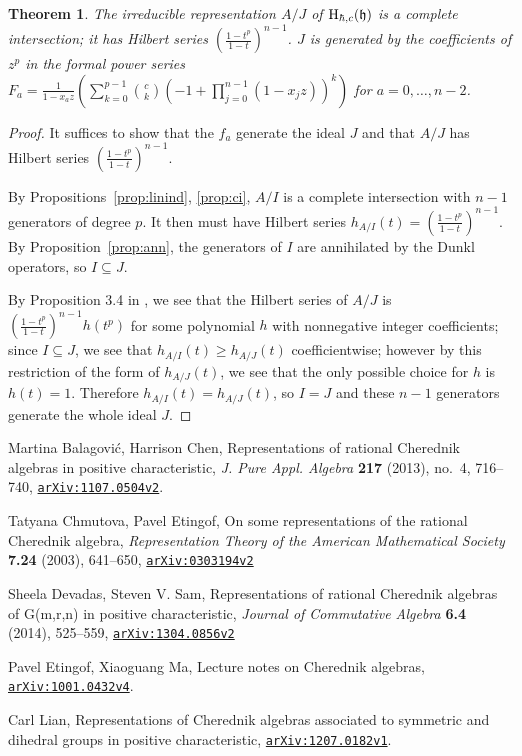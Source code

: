 \documentclass{article}
\numberwithin{equation}{section}
\newtheorem{theorem}[equation]{Theorem}
\newcommand{\h}{\mathfrak{h}}
\newcommand{\HH}{{\rm H}}
\newcommand{\arxiv}[1]{\href{http://arxiv.org/abs/#1}{{\tt arXiv:#1}}}
\begin{document}
\begin{theorem}\label{thm:main} The irreducible representation $A/J$  of $\HH_{\hbar,c}(\h)$ is a complete intersection; it has Hilbert series $\left(\frac{1-t^p}{1-t}\right)^{n-1}$. $J$ is generated by the coefficients of $z^p$ in the formal power series
\\$F_a=\frac{1}{1-x_az} \left( \sum_{k=0}^{p-1} \binom{c}{k}(-1+\prod_{j=0}^{n-1} (1-x_jz))^k\right)$ for $a=0,\dots,n-2$. 
\end{theorem} 

\begin{proof} It suffices to show that the $f_a$ generate the ideal $J$ and that $A/J$ has Hilbert series $\left(\frac{1-t^p}{1-t}\right)^{n-1}$. 

By Propositions~\ref{prop:linind}, \ref{prop:ci}, $A/I$ is a complete intersection with $n-1$ generators of degree $p$. It then must have Hilbert series $h_{A/I}(t)=\left(\frac{1-t^p}{1-t}\right)^{n-1}$. By Proposition~\ref{prop:ann}, the generators of $I$ are annihilated by the Dunkl operators, so $I \subseteq J$.

By Proposition 3.4 in \cite{BC1}, we see that the Hilbert series of $A/J$ is $\left(\frac{1-t^p}{1-t}\right)^{n-1}h(t^p)$ for some polynomial $h$ with nonnegative integer coefficients; since $I \subseteq J$, we see that $h_{A/I}(t) \ge h_{A/J}(t)$ coefficientwise; however by this restriction of the form of $h_{A/J}(t)$, we see that the only possible choice for $h$ is $h(t)=1$. Therefore $h_{A/I}(t)=h_{A/J}(t)$, so $I=J$ and these $n-1$ generators generate the whole ideal $J$.

\end{proof}








\begin{thebibliography}{2}

\setlength{\itemsep}{-1mm}
\small

 Martina Balagovi\'c, Harrison Chen, Representations of rational Cherednik algebras in positive characteristic, {\it J. Pure Appl. Algebra} {\bf 217} (2013), no.~4, 716--740, \arxiv{1107.0504v2}.

 Tatyana Chmutova, Pavel Etingof, On some representations of the rational Cherednik algebra, {\it Representation Theory of the American Mathematical Society} {\bf 7.24} (2003), 641--650, \arxiv{0303194v2}

 Sheela Devadas, Steven V. Sam, Representations of rational Cherednik algebras of G(m,r,n) in positive characteristic, {\it Journal of Commutative Algebra} {\bf 6.4} (2014), 525--559, \arxiv{1304.0856v2}

 Pavel Etingof, Xiaoguang Ma, Lecture notes on Cherednik algebras, \arxiv{1001.0432v4}.

 Carl Lian, Representations of Cherednik algebras associated to symmetric and dihedral groups in positive characteristic, \arxiv{1207.0182v1}.

\end{thebibliography}
\end{document}
